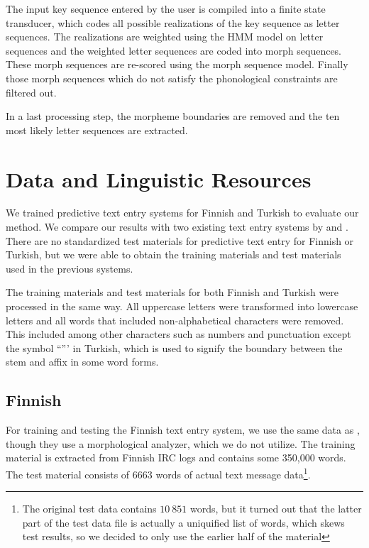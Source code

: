 \documentclass{llncs}
\begin{document}
The input key sequence entered by the user is compiled into a finite state
transducer, which codes all possible realizations of the key sequence
as letter sequences. The realizations are weighted using the HMM
model on letter sequences and the weighted letter sequences are coded
into morph sequences. These morph sequences are re-scored using the
morph sequence model. Finally those morph sequences which do not
satisfy the phonological constraints are filtered out. 

In a last processing step, the morpheme boundaries are removed and the
ten most likely letter sequences are extracted.

\section{Data and Linguistic Resources}\label{data}

We trained predictive text entry systems for Finnish and Turkish to
evaluate our method. We compare our results with two existing text
entry systems by \cite{silfverberg/2011/cla} and
\cite{Tantug:2010}. There are no standardized test materials for
predictive text entry for Finnish or Turkish, but we were able to
obtain the training materials and test materials used in the previous
systems.

The training materials and test materials for both Finnish and Turkish
were processed in the same way. All uppercase letters were transformed
into lowercase letters and all words that included non-alphabetical
characters were removed. This included among other characters such as
numbers and punctuation except the symbol ``''' in Turkish, which is
used to signify the boundary between the stem and affix in some word
forms.

\subsection{Finnish}

For training and testing the Finnish text entry system, we use the
same data as \cite{silfverberg/2011/cla}, though they use a
morphological analyzer, which we do not utilize. The training material
is extracted from Finnish IRC logs and contains some 350,000
words. The test material consists of $6663$ words of actual text
message data\footnote{The original test data contains $10\ 851$ words,
  but it turned out that the latter part of the test data file is
  actually a uniquified list of words, which skews test results, so we
  decided to only use the earlier half of the material}.
\end{document}
